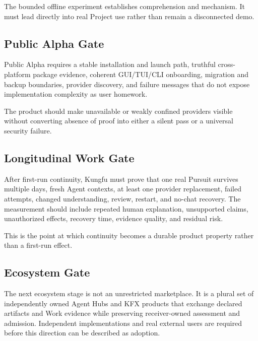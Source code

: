 The bounded offline experiment establishes comprehension and mechanism. It
must lead directly into real Project use rather than remain a disconnected
demo.

\subsection{Public Alpha Gate}

Public Alpha requires a stable installation and launch path, truthful
cross-platform package evidence, coherent GUI/TUI/CLI onboarding, migration
and backup boundaries, provider discovery, and failure messages that do not
expose implementation complexity as user homework.

The product should make unavailable or weakly confined providers visible
without converting absence of proof into either a silent pass or a universal
security failure.

\subsection{Longitudinal Work Gate}

After first-run continuity, Kungfu must prove that one real Pursuit survives
multiple days, fresh Agent contexts, at least one provider replacement, failed
attempts, changed understanding, review, restart, and no-chat recovery. The
measurement should include repeated human explanation, unsupported claims,
unauthorized effects, recovery time, evidence quality, and residual risk.

This is the point at which continuity becomes a durable product property
rather than a first-run effect.

\subsection{Ecosystem Gate}

The next ecosystem stage is not an unrestricted marketplace. It is a plural
set of independently owned Agent Hubs and KFX products that exchange declared
artifacts and Work evidence while preserving receiver-owned assessment and
admission. Independent implementations and real external users are required
before this direction can be described as adoption.
